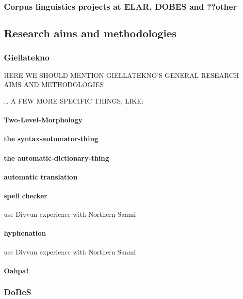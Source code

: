 \documentclass[a4paper,12pt]{article}
\begin{document}
\subsubsection{Corpus linguistics projects at ELAR, DOBES and ??other}

\subsection{Research aims and methodologies}

\subsubsection{Giellatekno} HERE WE SHOULD MENTION GIELLATEKNO'S GENERAL RESEARCH AIMS AND METHODOLOGIES

… A FEW MORE SPECIFIC THINGS, LIKE:
\paragraph{Two-Level-Morphology}

\paragraph{the syntax-automator-thing}

\paragraph{the automatic-dictionary-thing}

\paragraph{automatic translation}

\paragraph{spell checker} use Divvun experience with Northern Saami

\paragraph{hyphenation} use Divvun experience with Northern Saami

\paragraph{Oahpa!}

\subsubsection{DoBeS}
\end{document}
